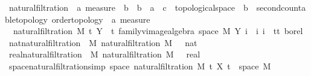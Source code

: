 \begin{isabellebody}
\ natural{\isacharunderscore}{\kern0pt}filtration\ {\isacharcolon}{\kern0pt}{\isacharcolon}{\kern0pt}\ {\isachardoublequoteopen}{\isacharprime}{\kern0pt}a\ measure\ {\isasymRightarrow}\ {\isacharprime}{\kern0pt}b\ {\isasymRightarrow}\ {\isacharparenleft}{\kern0pt}{\isacharprime}{\kern0pt}b\ {\isasymRightarrow}\ {\isacharprime}{\kern0pt}a\ {\isasymRightarrow}\ {\isacharprime}{\kern0pt}c\ {\isacharcolon}{\kern0pt}{\isacharcolon}{\kern0pt}\ topological{\isacharunderscore}{\kern0pt}space{\isacharparenright}{\kern0pt}\ {\isasymRightarrow}\ {\isacharprime}{\kern0pt}b\ {\isacharcolon}{\kern0pt}{\isacharcolon}{\kern0pt}\ {\isacharbraceleft}{\kern0pt}second{\isacharunderscore}{\kern0pt}countable{\isacharunderscore}{\kern0pt}topology{\isacharcomma}{\kern0pt}\ order{\isacharunderscore}{\kern0pt}topology{\isacharbraceright}{\kern0pt}\ {\isasymRightarrow}\ {\isacharprime}{\kern0pt}a\ measure{\isachardoublequoteclose}\ \isanewline
\ \ {\isachardoublequoteopen}natural{\isacharunderscore}{\kern0pt}filtration\ M\ t\ Y\ {\isacharequal}{\kern0pt}\ {\isacharparenleft}{\kern0pt}{\isasymlambda}t{\isachardot}{\kern0pt}\ family{\isacharunderscore}{\kern0pt}vimage{\isacharunderscore}{\kern0pt}algebra\ {\isacharparenleft}{\kern0pt}space\ M{\isacharparenright}{\kern0pt}\ {\isacharbraceleft}{\kern0pt}Y\ i\ {\isacharbar}{\kern0pt}\ i{\isachardot}{\kern0pt}\ i\ {\isasymin}\ {\isacharbraceleft}{\kern0pt}tt{\isacharbraceright}{\kern0pt}{\isacharbraceright}{\kern0pt}\ borel{\isacharparenright}{\kern0pt}{\isachardoublequoteclose}\isanewline
\isanewline
{}\isamarkupfalse%
\ {\isachardoublequoteopen}nat{\isacharunderscore}{\kern0pt}natural{\isacharunderscore}{\kern0pt}filtration\ {\isasymequiv}\ {\isasymlambda}M{\isachardot}{\kern0pt}\ natural{\isacharunderscore}{\kern0pt}filtration\ M\ {\isacharparenleft}{\kern0pt}{}\ {\isacharcolon}{\kern0pt}{\isacharcolon}{\kern0pt}\ nat{\isacharparenright}{\kern0pt}{\isachardoublequoteclose}\isanewline
{}\isamarkupfalse%
\ {\isachardoublequoteopen}real{\isacharunderscore}{\kern0pt}natural{\isacharunderscore}{\kern0pt}filtration\ {\isasymequiv}\ {\isasymlambda}M{\isachardot}{\kern0pt}\ natural{\isacharunderscore}{\kern0pt}filtration\ M\ {\isacharparenleft}{\kern0pt}{}\ {\isacharcolon}{\kern0pt}{\isacharcolon}{\kern0pt}\ real{\isacharparenright}{\kern0pt}{\isachardoublequoteclose}\isanewline
\isanewline
{}\isamarkupfalse%
\ space{\isacharunderscore}{\kern0pt}natural{\isacharunderscore}{\kern0pt}filtration{\isacharbrackleft}{\kern0pt}simp{\isacharbrackright}{\kern0pt}{\isacharcolon}{\kern0pt}\ {\isachardoublequoteopen}space\ {\isacharparenleft}{\kern0pt}natural{\isacharunderscore}{\kern0pt}filtration\ M\ t\ X\ t{\isacharparenright}{\kern0pt}\ {\isacharequal}{\kern0pt}\ space\ M{\isachardoublequoteclose}%

\end{isabellebody}
